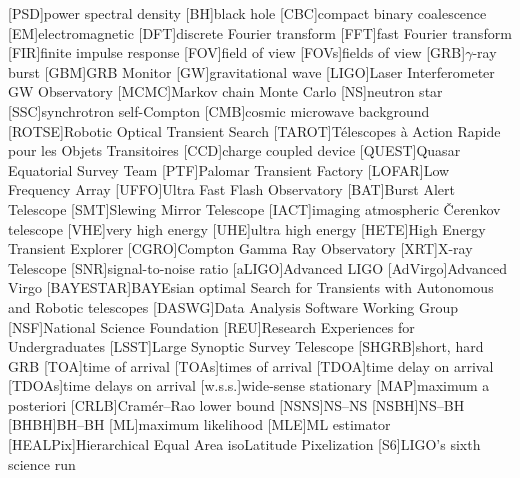 \usepackage{acronym}

[PSD]{power spectral density}
[BH]{black hole}
[CBC]{compact binary coalescence}
[EM]{electromagnetic}
[DFT]{discrete Fourier transform}
[FFT]{fast Fourier transform}
[FIR]{finite impulse response}
[FOV]{field of view}
[FOVs]{fields of view}
[GRB]{$\gamma$\nobreakdashes-ray burst}
[GBM]{\acl{GRB} Monitor}
[GW]{gravitational wave}
[LIGO]{Laser Interferometer \acs{GW} Observatory}
[MCMC]{Markov chain Monte Carlo}
[NS]{neutron star}
[SSC]{synchrotron self\nobreakdashes-Compton}
[CMB]{cosmic microwave background}
[ROTSE]{Robotic Optical Transient Search}
[TAROT]{T\'{e}lescopes \`{a} Action Rapide pour les Objets Transitoires}
[CCD]{charge coupled device}
[QUEST]{Quasar Equatorial Survey Team}
[PTF]{Palomar Transient Factory}
[LOFAR]{Low Frequency Array}
[UFFO]{Ultra Fast Flash Observatory}
[BAT]{Burst Alert Telescope}
[SMT]{Slewing Mirror Telescope}
[IACT]{imaging atmospheric \v{C}erenkov telescope}
[VHE]{very high energy}
[UHE]{ultra high energy}
[HETE]{High Energy Transient Explorer}
[CGRO]{Compton Gamma Ray Observatory}
[XRT]{X\nobreakdashes-ray Telescope}
[SNR]{signal\nobreakdashes-to\nobreakdashes-noise ratio}
[aLIGO]{Advanced \acs{LIGO}}
[AdVirgo]{Advanced Virgo}
[BAYESTAR]{BAYEsian optimal Search for Transients with Autonomous and Robotic telescopes}
[DASWG]{Data Analysis Software Working Group}
[NSF]{National Science Foundation}
[REU]{Research Experiences for Undergraduates}
[LSST]{Large Synoptic Survey Telescope}
[SHGRB]{short, hard \acl{GRB}}
[TOA]{time of arrival}
[TOAs]{times of arrival}
[TDOA]{time delay on arrival}
[TDOAs]{time delays on arrival}
[w.s.s.]{wide\nobreakdashes-sense stationary}
[MAP]{maximum a posteriori}
[CRLB]{Cram\'{e}r\nobreakdashes--Rao lower bound}
[NSNS]{\acl{NS}\nobreakdashes--\acl{NS}}
[NSBH]{\acl{NS}\nobreakdashes--\acl{BH}}
[BHBH]{\acl{BH}\nobreakdashes--\acl{BH}}
[ML]{maximum likelihood}
[MLE]{\ac{ML} estimator}
[HEALPix]{Hierarchical Equal Area isoLatitude Pixelization}
[S6]{\ac{LIGO}'s sixth science run}
